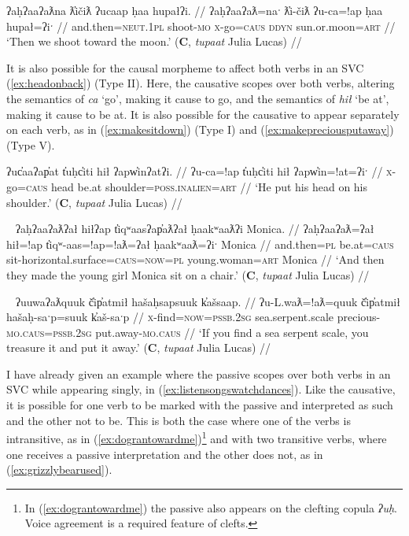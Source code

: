{\ex \label{ex:shootatthemoon}
\begingl
\glpreamble ʔaḥʔaaʔaƛna ƛ̓ičiƛ ʔucaap ḥaa hupałʔi. //
\gla ʔaḥʔaaʔaƛ=naˑ ƛ̓i-čiƛ ʔu-ca=!ap ḥaa hupał=ʔiˑ //
\glb and.then=\textsc{neut.1pl} shoot-\textsc{mo} \textsc{x}-go=\textsc{caus} \textsc{ddyn} sun.or.moon=\textsc{art} //
\glft `Then we shoot toward the moon.' (\textbf{C}, \textit{tupaat} Julia Lucas) //
\endgl
\xe

It is also possible for the causal morpheme to affect both verbs in an SVC (\ref{ex:headonback}) (Type II). Here, the causative scopes over both verbs, altering the semantics of \textit{ca} `go', making it cause to go, and the semantics of \textit{hił} `be at', making it cause to be at. It is also possible for the causative to appear separately on each verb, as in (\ref{ex:makesitdown}) (Type I) and (\ref{ex:makepreciousputaway}) (Type V).

\ex \label{ex:headonback}
\begingl
\glpreamble ʔuc̓aaʔap̓at t̓uḥc̓iti hił ʔapw̓inʔatʔi. //
\gla ʔu-ca=!ap t̓uḥc̓iti hił ʔapw̓in=!at=ʔiˑ //
\glb \textsc{x}-go=\textsc{caus} head be.at shoulder=\textsc{poss.inalien}=\textsc{art} //
\glft `He put his head on his shoulder.' (\textbf{C}, \textit{tupaat} Julia Lucas) //
\endgl
\xe

\ex~ \label{ex:makesitdown}
\begingl
\glpreamble ʔaḥʔaaʔaƛʔał hiłʔap t̓iqʷaasʔap̓aƛʔał ḥaakʷaaƛʔi Monica. //
\gla ʔaḥʔaaʔaƛ=ʔał hił=!ap t̓iqʷ-aas=!ap=!aƛ=ʔał ḥaakʷaaƛ=ʔiˑ Monica //
\glb and.then=\textsc{pl} be.at=\textsc{caus} sit-horizontal.surface=\textsc{caus}=\textsc{now}=\textsc{pl} young.woman=\textsc{art} Monica //
\glft `And then they made the young girl Monica sit on a chair.' (\textbf{C}, \textit{tupaat} Julia Lucas) //
\endgl
\xe

\ex~ \label{ex:makepreciousputaway}
\begingl
\glpreamble ʔuuwaʔaƛquuk č̓ip̓atmił hašaḥsapsuuk k̓ašsaap. //
\gla ʔu-L.waƛ=!aƛ=quuk č̓ip̓atmił hašaḥ-saˑp=suuk k̓aš-saˑp //
\glb \textsc{x}-find=\textsc{now}=\textsc{pssb.2sg} sea.serpent.scale precious-\textsc{mo.caus}=\textsc{pssb.2sg} put.away-\textsc{mo.caus} //
\glft `If you find a sea serpent scale, you treasure it and put it away.' (\textbf{C}, \textit{tupaat} Julia Lucas) //
\endgl
\xe


I have already given an example where the passive scopes over both verbs in an SVC while appearing singly, in (\ref{ex:listensongswatchdances}). Like the causative, it is possible for one verb to be marked with the passive and interpreted as such and the other not to be. This is both the case where one of the verbs is intransitive, as in (\ref{ex:dograntowardme})\footnote{In (\ref{ex:dograntowardme}) the passive also appears on the clefting copula \textit{ʔuḥ}. Voice agreement is a required feature of clefts.} and with two transitive verbs, where one receives a passive interpretation and the other does not, as in (\ref{ex:grizzlybearused}).

}
